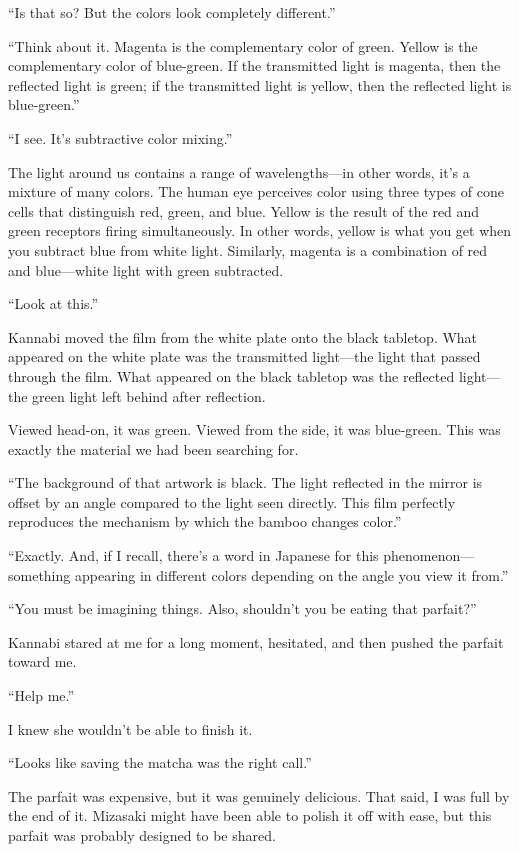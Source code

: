 \documentclass[
    a4paper,
    12pt,
    twoside,
    openany,
    UTF8,
    fontset=windows
]{ctexbook}
\begin{document}
``Is that so? But the colors look completely different.''

``Think about it. Magenta is the complementary color of green. Yellow is the complementary color of blue-green. If the transmitted light is magenta, then the reflected light is green; if the transmitted light is yellow, then the reflected light is blue-green.''

``I see. It's subtractive color mixing.''

The light around us contains a range of wavelengths---in other words, it's a mixture of many colors. The human eye perceives color using three types of cone cells that distinguish red, green, and blue. Yellow is the result of the red and green receptors firing simultaneously. In other words, yellow is what you get when you subtract blue from white light. Similarly, magenta is a combination of red and blue---white light with green subtracted.

``Look at this.''

Kannabi moved the film from the white plate onto the black tabletop. What appeared on the white plate was the transmitted light---the light that passed through the film. What appeared on the black tabletop was the reflected light---the green light left behind after reflection.

Viewed head-on, it was green. Viewed from the side, it was blue-green. This was exactly the material we had been searching for.

``The background of that artwork is black. The light reflected in the mirror is offset by an angle compared to the light seen directly. This film perfectly reproduces the mechanism by which the bamboo changes color.''

``Exactly. And, if I recall, there's a word in Japanese for this phenomenon---something appearing in different colors depending on the angle you view it from.''

``You must be imagining things. Also, shouldn't you be eating that parfait?''

Kannabi stared at me for a long moment, hesitated, and then pushed the parfait toward me.

``Help me.''

I knew she wouldn't be able to finish it.

``Looks like saving the matcha was the right call.''

The parfait was expensive, but it was genuinely delicious. That said, I was full by the end of it. Mizasaki might have been able to polish it off with ease, but this parfait was probably designed to be shared.
\end{document}
